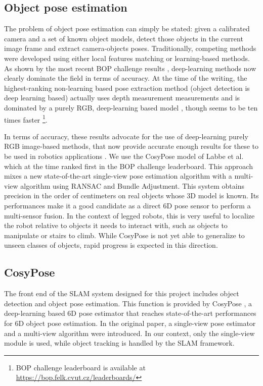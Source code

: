 \subsection{Object pose estimation}
\label{sec:object_pose_est_algos}
The problem of object pose estimation can simply be stated: given a calibrated camera and a set of known object models, detect those objects in the current image 
frame and extract camera-objects poses. Traditionally, competing methods were developed using either local features matching or learning-based methods.
As shown by the most recent BOP challenge results \cite{hodan2020bop}, deep-learning methods now clearly dominate the field in terms of accuracy. 
At the time of the writing, the highest-ranking non-learning based pose extraction method \cite{konig2020hybrid} (object detection is deep learning based) 
actually uses depth measurement measurements and is dominated by a purely RGB, deep-learning based model \cite{haugaard2021surfemb}, though \cite{konig2020hybrid} 
seems to be ten times faster \footnote{BOP challenge leaderboard is available at \url{https://bop.felk.cvut.cz/leaderboards/}}.

In terms of accuracy, these results advocate for the use of deep-learning purely RGB image-based methods, that now provide accurate enough results 
for these to be used in robotics applications \cite{labbe2021single}. 
We use the CosyPose model of Labbe et al. \cite{labbe2020cosypose} which at the time ranked first in the BOP challenge leaderboard.
This approach mixes a new state-of-the-art single-view pose estimation algorithm with a multi-view algorithm using RANSAC and Bundle Adjustment. 
This system obtains precision in the order of centimeters 
on real objects whose 3D model is known. Its performances make it a good candidate as a direct 6D pose sensor to perform a multi-sensor fusion. 
In the context of legged robots, this is very useful to localize the robot relative to objects it needs to interact with, such as objects 
to manipulate or stairs to climb. While CosyPose is not yet able to generalize to unseen classes of objects, rapid progress is expected in 
this direction.

\subsection{CosyPose}
The front end of the SLAM system designed for this project includes object detection and object pose estimation. 
This function is provided by CosyPose \cite{labbe2020cosypose}, a deep-learning based 6D pose estimator that reaches state-of-the-art
 performances for 6D object pose estimation.
In the original paper, a single-view pose estimator and a multi-view algorithm were introduced. In our context, only the single-view module is used, 
while object tracking is handled by the SLAM framework. 

